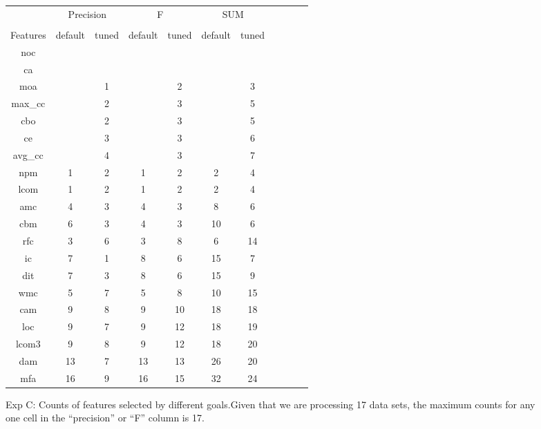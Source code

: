 \documentclass{acm_proc_article-sp}
\begin{document}
\begin{figure}[!t]

\renewcommand{\baselinestretch}{0.8}
\scriptsize
\centering
  \begin{tabular}{c|c c|c c|c c|c c| c c }
  
    &   \multicolumn{2}{c|}{Precision} & \multicolumn{2}{c|}{F} &  \multicolumn{2}{c|}{SUM}\\
 &&&&&&&\\
Features&   
  default
& tuned
& default
& tuned
& default
& tuned
\\\hline
 
noc& & & & & & \\
ca& & & & & & \\
moa&& 1& & 2& & 3\\
max\_cc& & 2& & 3& & 5\\
cbo& & 2& & 3& & 5\\
ce& & 3& & 3& & 6\\
avg\_cc& & 4& & 3& & 7\\
npm& 1& 2& 1& 2&2 & 4\\
lcom& 1& 2& 1& 2& 2& 4\\
amc& 4& 3& 4& 3& 8& 6\\
cbm& 6& 3& 4& 3& 10& 6\\
rfc& 3& 6& 3& 8&6 & 14\\
ic& 7& 1& 8& 6& 15& 7\\
dit& 7& 3& 8& 6& 15& 9\\
wmc& 5& 7& 5& 8& 10& 15\\
cam& 9& 8& 9& 10& 18& 18\\
loc& 9& 7& 9& 12& 18& 19\\
lcom3& 9& 8& 9& 12& 18& 20\\
dam& 13& 7& 13& 13&26 & 20\\
mfa& 16& 9& 16& 15& 32& 24\\


  \end{tabular}
    \caption{ Exp C: Counts of features selected by different goals.Given that we are processing 17 data sets, the maximum counts for any 
one cell in the ``precision'' or ``F'' column is 17.  
    }\label{fig:counts}
\end{figure}
\end{document}
